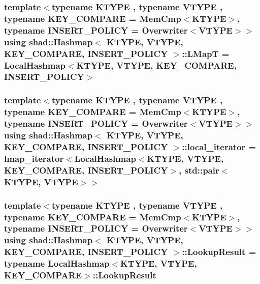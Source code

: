 \hypertarget{classshad_1_1Hashmap_aace37116c38330a70352a3081d0ec07e}{
\subsubsection[{L\-Map\-T}]{\setlength{\rightskip}{0pt plus 5cm}template$<$typename K\-T\-Y\-P\-E , typename V\-T\-Y\-P\-E , typename K\-E\-Y\-\_\-\-C\-O\-M\-P\-A\-R\-E  = Mem\-Cmp$<$\-K\-T\-Y\-P\-E$>$, typename I\-N\-S\-E\-R\-T\-\_\-\-P\-O\-L\-I\-C\-Y  = Overwriter$<$\-V\-T\-Y\-P\-E$>$$>$ using {\bf shad\-::\-Hashmap}$<$ K\-T\-Y\-P\-E, V\-T\-Y\-P\-E, K\-E\-Y\-\_\-\-C\-O\-M\-P\-A\-R\-E, I\-N\-S\-E\-R\-T\-\_\-\-P\-O\-L\-I\-C\-Y $>$\-::{\bf L\-Map\-T} =  {\bf Local\-Hashmap}$<$K\-T\-Y\-P\-E, V\-T\-Y\-P\-E, K\-E\-Y\-\_\-\-C\-O\-M\-P\-A\-R\-E, I\-N\-S\-E\-R\-T\-\_\-\-P\-O\-L\-I\-C\-Y$>$}}\label{classshad_1_1Hashmap_aace37116c38330a70352a3081d0ec07e}
\hypertarget{classshad_1_1Hashmap_abf95d16be9ba9060bff9fa591ece302f}{
\subsubsection[{local\-\_\-iterator}]{\setlength{\rightskip}{0pt plus 5cm}template$<$typename K\-T\-Y\-P\-E , typename V\-T\-Y\-P\-E , typename K\-E\-Y\-\_\-\-C\-O\-M\-P\-A\-R\-E  = Mem\-Cmp$<$\-K\-T\-Y\-P\-E$>$, typename I\-N\-S\-E\-R\-T\-\_\-\-P\-O\-L\-I\-C\-Y  = Overwriter$<$\-V\-T\-Y\-P\-E$>$$>$ using {\bf shad\-::\-Hashmap}$<$ K\-T\-Y\-P\-E, V\-T\-Y\-P\-E, K\-E\-Y\-\_\-\-C\-O\-M\-P\-A\-R\-E, I\-N\-S\-E\-R\-T\-\_\-\-P\-O\-L\-I\-C\-Y $>$\-::{\bf local\-\_\-iterator} =  {\bf lmap\-\_\-iterator}$<${\bf Local\-Hashmap}$<$K\-T\-Y\-P\-E, V\-T\-Y\-P\-E, K\-E\-Y\-\_\-\-C\-O\-M\-P\-A\-R\-E, I\-N\-S\-E\-R\-T\-\_\-\-P\-O\-L\-I\-C\-Y$>$, std\-::pair$<$K\-T\-Y\-P\-E, V\-T\-Y\-P\-E$>$$>$}}\label{classshad_1_1Hashmap_abf95d16be9ba9060bff9fa591ece302f}
\hypertarget{classshad_1_1Hashmap_acc8ac68502c6c886d18d660e907fef0a}{
\subsubsection[{Lookup\-Result}]{\setlength{\rightskip}{0pt plus 5cm}template$<$typename K\-T\-Y\-P\-E , typename V\-T\-Y\-P\-E , typename K\-E\-Y\-\_\-\-C\-O\-M\-P\-A\-R\-E  = Mem\-Cmp$<$\-K\-T\-Y\-P\-E$>$, typename I\-N\-S\-E\-R\-T\-\_\-\-P\-O\-L\-I\-C\-Y  = Overwriter$<$\-V\-T\-Y\-P\-E$>$$>$ using {\bf shad\-::\-Hashmap}$<$ K\-T\-Y\-P\-E, V\-T\-Y\-P\-E, K\-E\-Y\-\_\-\-C\-O\-M\-P\-A\-R\-E, I\-N\-S\-E\-R\-T\-\_\-\-P\-O\-L\-I\-C\-Y $>$\-::{\bf Lookup\-Result} =  typename {\bf Local\-Hashmap}$<$K\-T\-Y\-P\-E, V\-T\-Y\-P\-E, K\-E\-Y\-\_\-\-C\-O\-M\-P\-A\-R\-E$>$\-::{\bf Lookup\-Result}}}\label{classshad_1_1Hashmap_acc8ac68502c6c886d18d660e907fef0a}
